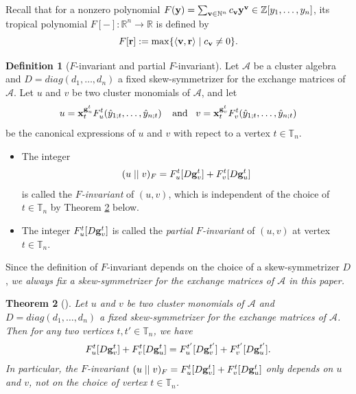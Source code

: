 \documentclass[10pt]{amsart}
\newtheorem{theorem}{Theorem}[section]
\theoremstyle{definition}
\newtheorem{definition}[theorem]{Definition}
\theoremstyle{remark}
\numberwithin{equation}{section}
\begin{document}
Recall that for a nonzero polynomial
$F({\bf y})=\sum_{{\bf v}\in\mathbb N^n}c_{\bf v}{\bf y}^{\bf v}\in\mathbb Z[y_1,\ldots,y_n]$, its tropical polynomial $F[-]:\mathbb R^n\to \mathbb R$ is defined by
\[F[{\bf r}]:=\max\{\langle{{\bf v},{\bf r}}\rangle\mid c_{\bf v}\neq 0\}.\]

\begin{definition}[$F$-invariant and partial $F$-invariant] \label{def:F-inv}
Let $\mathcal A$ be a cluster algebra and $D=diag(d_1,\ldots,d_n)$ a fixed skew-symmetrizer for the exchange matrices of $\mathcal A$.
Let $u$ and $v$ be two cluster monomials of $\mathcal A$, and let 
\[
 u={\bf x}_t^{{\bf g}_u^t}F_u^t(\hat y_{1;t},\ldots,\hat y_{n;t}) \;\;\;\;\text{and}\;\;\; v={\bf x}_t^{{\bf g}_{v}^t}F_{v}^t(\hat y_{1;t},\ldots,\hat y_{n;t})
\]
be the canonical expressions of $u$ and $v$ with repect to a vertex $t\in \mathbb T_n$.  
\begin{itemize}
    \item [(i)] 
The integer 
\begin{eqnarray}\label{eqn:def-F-inv}
    (u\mid\mid v)_F=F_u^t[D{\bf g}_{v}^t]+F_{v}^t[D{\bf g}_{u}^t]\nonumber
\end{eqnarray}
is called the {\em $F$-invariant} of  $(u,v)$, which is independent of the choice of $t\in\mathbb T_n$ by Theorem \ref{thm:F-inv} below.
\item[(ii)]  The integer $F_u^t[D{\bf g}_{v}^t]$ is called the {\em partial $F$-invariant} of $(u,v)$ at vertex $t\in\mathbb T_n$.
\end{itemize}
\end{definition}
Since the definition of $F$-invariant depends on the choice of a skew-symmetrizer $D$, {\em we always fix a skew-symmetrizer for the exchange matrices of $\mathcal A$ in this paper.}


\begin{theorem}[{\cite[Theorem 4.10, Proposition 4.30]{Cao-2023}}]
\label{thm:F-inv}
    Let $u$ and $v$ be two cluster monomials of $\mathcal A$ and $D=diag(d_1,\ldots,d_n)$ a fixed skew-symmetrizer for the exchange matrices of $\mathcal A$. Then 
        for any two vertices $t,t'\in\mathbb T_n$, we have 
\begin{eqnarray}\label{eqn:F-inv-mut}
            F_u^t[D{\bf g}_{v}^t]+F_{v}^t[D{\bf g}_u^t]=F_u^{t'}[D{\bf g}_{v}^{t'}]+F_{v}^{t'}[D{\bf g}_u^{t'}].\nonumber
        \end{eqnarray}
        In particular, the $F$-invariant $(u\mid\mid v)_F=F_u^t[D{\bf g}_{v}^t]+F_{v}^t[D{\bf g}_u^t]$ only depends on $u$ and $v$, not on the choice of vertex $t\in\mathbb T_n$.
\end{theorem}
\end{document}
